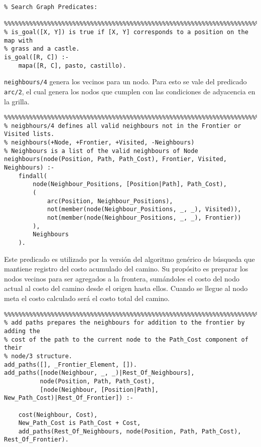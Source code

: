 \documentclass[a4paper,12pt]{report}
\begin{document}
\begin{verbatim}
% Search Graph Predicates:

%%%%%%%%%%%%%%%%%%%%%%%%%%%%%%%%%%%%%%%%%%%%%%%%%%%%%%%%%%%%%%%%%%%%%%%%%%%%%%%
% is_goal([X, Y]) is true if [X, Y] corresponds to a position on the map with
% grass and a castle.
is_goal([R, C]) :-
    mapa([R, C], pasto, castillo).

\end{verbatim}

\texttt{neighbours/4} genera los vecinos para un nodo. Para esto se vale del predicado \texttt{arc/2}, el cual genera
los nodos que cumplen con las condiciones de adyacencia en la grilla.

\begin{verbatim}
%%%%%%%%%%%%%%%%%%%%%%%%%%%%%%%%%%%%%%%%%%%%%%%%%%%%%%%%%%%%%%%%%%%%%%%%%%%%%%%
% neigbhours/4 defines all valid neighbours not in the Frontier or Visited lists.
% neighbours(+Node, +Frontier, +Visited, -Neighbours)
% Neighbours is a list of the valid neighbours of Node
neighbours(node(Position, Path, Path_Cost), Frontier, Visited, Neighbours) :-
    findall(
        node(Neighbour_Positions, [Position|Path], Path_Cost),
        (
            arc(Position, Neighbour_Positions),
            not(member(node(Neighbour_Positions, _, _), Visited)),
            not(member(node(Neighbour_Positions, _, _), Frontier))
        ),
        Neighbours
    ).

\end{verbatim}

Este predicado es utilizado por la versi\'{o}n del algoritmo gen\'{e}rico de b\'{u}squeda que mantiene registro del
costo acumulado del camino. Su prop\'{o}sito es preparar los nodos vecinos para ser agregados a la frontera,
sum\'{a}ndoles el costo del nodo actual al costo del camino desde el origen hasta ellos. Cuando se llegue al nodo meta
el costo calculado ser\'{a} el costo total del camino.

\begin{verbatim}
%%%%%%%%%%%%%%%%%%%%%%%%%%%%%%%%%%%%%%%%%%%%%%%%%%%%%%%%%%%%%%%%%%%%%%%%%%%%%%%
% add paths prepares the neighbours for addition to the frontier by adding the
% cost of the path to the current node to the Path_Cost component of their
% node/3 structure.
add_paths([], _Frontier_Element, []).
add_paths([node(Neighbour, _, _)|Rest_Of_Neighbours],
          node(Position, Path, Path_Cost),
          [node(Neighbour, [Position|Path], New_Path_Cost)|Rest_Of_Frontier]) :-

    cost(Neighbour, Cost),
    New_Path_Cost is Path_Cost + Cost,
    add_paths(Rest_Of_Neighbours, node(Position, Path, Path_Cost), Rest_Of_Frontier).

\end{verbatim}
\end{document}
